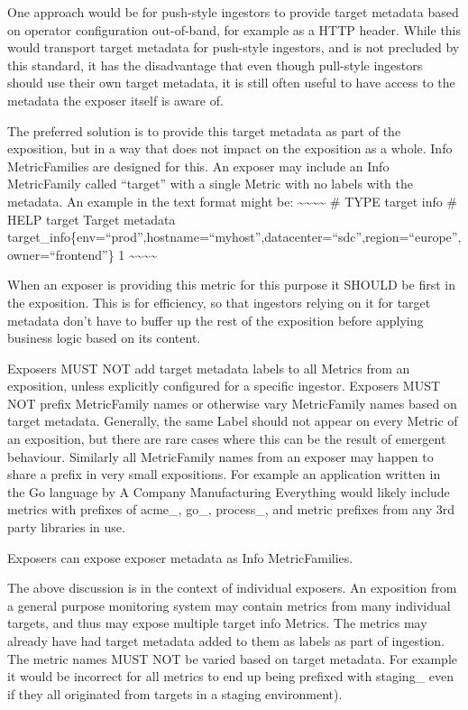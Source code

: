 \documentclass[a4paper,12pt,notitlepage,twoside,openright]{article}
\begin{document}
One approach would be for push-style ingestors to provide target
metadata based on operator configuration out-of-band, for example as a
HTTP header. While this would transport target metadata for push-style
ingestors, and is not precluded by this standard, it has the
disadvantage that even though pull-style ingestors should use their own
target metadata, it is still often useful to have access to the metadata
the exposer itself is aware of.

The preferred solution is to provide this target metadata as part of the
exposition, but in a way that does not impact on the exposition as a
whole. Info MetricFamilies are designed for this. An exposer may include
an Info MetricFamily called ``target'' with a single Metric with no
labels with the metadata. An example in the text format might be:
\textasciitilde\textasciitilde\textasciitilde\textasciitilde{} \# TYPE
target info \# HELP target Target metadata
target\_info\{env=``prod'',hostname=``myhost'',datacenter=``sdc'',region=``europe'',owner=``frontend''\}
1 \textasciitilde\textasciitilde\textasciitilde\textasciitilde{}

When an exposer is providing this metric for this purpose it SHOULD be
first in the exposition. This is for efficiency, so that ingestors
relying on it for target metadata don't have to buffer up the rest of
the exposition before applying business logic based on its content.

Exposers MUST NOT add target metadata labels to all Metrics from an
exposition, unless explicitly configured for a specific ingestor.
Exposers MUST NOT prefix MetricFamily names or otherwise vary
MetricFamily names based on target metadata. Generally, the same Label
should not appear on every Metric of an exposition, but there are rare
cases where this can be the result of emergent behaviour. Similarly all
MetricFamily names from an exposer may happen to share a prefix in very
small expositions. For example an application written in the Go language
by A Company Manufacturing Everything would likely include metrics with
prefixes of acme\_, go\_, process\_, and metric prefixes from any 3rd
party libraries in use.

Exposers can expose exposer metadata as Info MetricFamilies.

The above discussion is in the context of individual exposers. An
exposition from a general purpose monitoring system may contain metrics
from many individual targets, and thus may expose multiple target info
Metrics. The metrics may already have had target metadata added to them
as labels as part of ingestion. The metric names MUST NOT be varied
based on target metadata. For example it would be incorrect for all
metrics to end up being prefixed with staging\_ even if they all
originated from targets in a staging environment).
\end{document}
